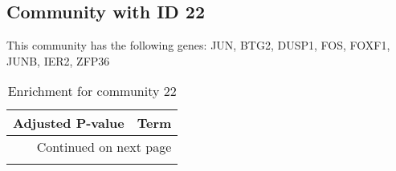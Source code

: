\subsection*{Community with ID 22}
This community has the following genes: JUN, BTG2, DUSP1, FOS, FOXF1, JUNB, IER2, ZFP36
\\
\begin{longtable}{p{2.4cm}p{14.5cm}}
\caption{Enrichment for community 22}\\
\toprule
Adjusted \newline P-value &                                                                                                    Term \\
\midrule
\endhead
\midrule
\multicolumn{2}{r}{{Continued on next page}} \\
\midrule
\endfoot


\end{longtable}
